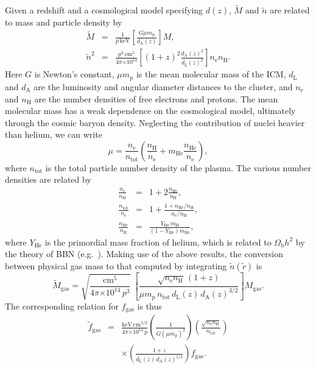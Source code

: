 \documentclass[useAMS,usenatbib,usegraphicx]{mn2e}
\newcommand*{\mysub}[2]{\ensuremath{#1_{\mathrm{#2}}}}
\newcommand*{\unit}[1]{\ensuremath{\mathrm{\, #1}}}
\newcommand*{\Omegab}{\mysub{\Omega}{b}}
\newcommand*{\fgas}{\mysub{f}{gas}}
\newcommand*{\Mgas}{\mysub{M}{gas}}
\newcommand*{\mproton}{\mysub{m}{p}}
\newcommand*{\mH}{\mysub{m}{H}}
\newcommand*{\mHe}{\mysub{m}{He}}
\newcommand*{\nelec}{\mysub{n}{e}}
\newcommand*{\nH}{\mysub{n}{H}}
\newcommand*{\nHe}{\mysub{n}{He}}
\newcommand*{\ntot}{\mysub{n}{tot}}
\newcommand*{\YHe}{\mysub{Y}{He}}
\newcommand*{\dA}{\mysub{d}{A}}
\newcommand*{\dL}{\mysub{d}{L}}
\newcommand*{\cm}{\unit{cm}}
\newcommand*{\keV}{\unit{keV}}
\newcommand*{\E}[1]{\ensuremath{\times 10^{#1}}}
\newcommand*{\xsmod}[1]{\ensuremath{\widetilde{#1}}}
\begin{document}
Given a redshift and a cosmological model specifying $d(z)$, $\xsmod{M}$ and $\xsmod{n}$ are related to mass and particle density by
\begin{eqnarray}
  \xsmod{M}   & = & \frac{1}{p\keV}\left[ \frac{G\mu\mproton }{\dA(z)} \right] M, \nonumber \\
  \xsmod{n}^2 & = & \frac{p^3 \cm^{5}}{4\pi\E{14}} \left[ (1+z)^2 \frac{\dA(z)^3}{\dL(z)^2} \right] \nelec\nH.
\end{eqnarray}
Here $G$ is Newton's constant, $\mu\mproton$ is the mean molecular mass of the ICM, $\dL$ and \dA{} are the luminosity and angular diameter distances to the cluster, and $\nelec$ and $\nH$ are the number densities of free electrons and protons. The mean molecular mass has a weak dependence on the cosmological model, ultimately through the cosmic baryon density. Neglecting the contribution of nuclei heavier than helium, we can write
\begin{equation}
  \mu = \frac{\nelec}{\ntot} \left( \frac{\nH}{\nelec} + \mHe \frac{\nHe}{\nelec} \right),
\end{equation}
where $\ntot$ is the total particle number density of the plasma. The various number densities are related by
\begin{eqnarray}
  \frac{\nelec}{\nH} &=& 1 + 2\frac{\nHe}{\nH}, \nonumber \\
  \frac{\ntot}{\nelec} &=& 1 + \frac{1 + \nHe/\nH}{\nelec/\nH}, \nonumber \\
  \frac{\nHe}{\nH} &=& \frac{\YHe \, \mH}{(1-\YHe)\mHe},
\end{eqnarray}
where $\YHe$ is the primordial mass fraction of helium, which is related to $\Omegab h^2$ by the theory of BBN (e.g.\ \citealt{Pisanti0705.0290}). Making use of the above results, the conversion between physical gas mass to that computed by integrating $\xsmod{n}(\xsmod{r})$ is
\begin{equation}
  \xsmod{M}_\mathrm{gas} = \sqrt{\frac{\mathrm{cm}^5}{4\pi\E{14}\,p^3}} ~ \left[ \frac{\sqrt{\nelec\nH}\,(1+z)}{\mu\mproton\,\ntot\,\dL(z)\,\dA(z)^{3/2}} \right] \Mgas.
\end{equation}
The corresponding relation for \fgas{} is thus
\begin{eqnarray}
  \xsmod{f}_\mathrm{gas} & = & \frac{\mathrm{keV}\cm^{5/2}}{4\pi\E{14}\,p} \left( \frac{1}{G(\mu\mproton)^2} \right) \left( \frac{\sqrt{\nelec\nH}}{\ntot} \right) \nonumber\\
  & & \times \left( \frac{1+z}{\dL(z)\,\dA(z)^{1/2}} \right) \fgas.
\end{eqnarray}
\end{document}
